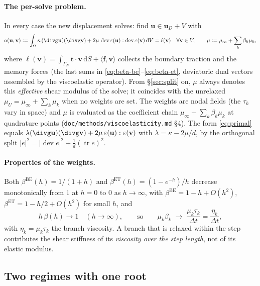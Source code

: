 \documentclass[11pt]{article}
\numberwithin{equation}{section}
\theoremstyle{remark}
\newcommand{\eps}{\varepsilon}
\newcommand{\dV}{\,\mathrm{d}V}
\newcommand{\dS}{\,\mathrm{d}S}
\newcommand{\tr}{\operatorname{tr}}
\newcommand{\dev}{\operatorname{dev}}
\newcommand{\vu}{\mathbf{u}}
\newcommand{\vv}{\mathbf{v}}
\newcommand{\vt}{\mathbf{t}}
\newcommand{\vf}{\mathbf{f}}
\newcommand{\code}[1]{\texttt{#1}}
\begin{document}
\paragraph{The per-solve problem.} In every case the new displacement
solves: find $\vu \in \vu_D + V$ with
\begin{equation}
  a(\vu,\vv) := \int_\Omega \kappa\,(\divg\vu)(\divg\vv)
   + 2\mu\,\dev\eps(\vu):\dev\eps(\vv)\dV = \ell(\vv)
  \quad \forall \vv\in V,
  \qquad
  \mu := \mu_\infty + \sum_k \beta_k \mu_k ,
  \label{eq:primal}
\end{equation}
where $\ell(\vv) = \int_{\Gamma_N}\vt\cdot\vv\dS + \langle \vf,\vv\rangle$
collects the boundary traction and the memory forces (the last sums in
\eqref{eq:beta-be}--\eqref{eq:beta-et}, deviatoric dual vectors
assembled by the viscoelastic operator). From \S\ref{sec:split} on, $\mu$
always denotes this \emph{effective} shear modulus of the solve; it
coincides with the unrelaxed $\mu_U = \mu_\infty + \sum_k\mu_k$ when no
weights are set. The weights are nodal fields (the $\tau_k$ vary in space)
and $\mu$ is evaluated as the coefficient chain $\mu_\infty + \sum_k
\beta_k\mu_k$ at quadrature points (\code{doc/methods/viscoelasticity.md} \S4).
The form \eqref{eq:primal} equals $\lambda(\divg\vu)(\divg\vv) +
2\mu\,\eps(\vu):\eps(\vv)$ with $\lambda = \kappa - 2\mu/d$, by the
orthogonal split $|e|^2 = |\dev e|^2 + \frac1d(\tr e)^2$.

\paragraph{Properties of the weights.} Both $\beta^{\mathrm{BE}}(h) =
1/(1+h)$ and $\beta^{\mathrm{ET}}(h) = (1-e^{-h})/h$ decrease
monotonically from $1$ at $h = 0$ to $0$ as $h\to\infty$, with
$\beta^{\mathrm{BE}} = 1 - h + O(h^2)$, $\beta^{\mathrm{ET}} = 1 - h/2 +
O(h^2)$ for small $h$, and
\begin{equation}
  h\,\beta(h) \to 1 \quad (h\to\infty),
  \qquad\text{so}\qquad
  \mu_k\beta_k \;\longrightarrow\; \frac{\mu_k\tau_k}{\Delta t}
  = \frac{\eta_k}{\Delta t},
  \label{eq:collapse}
\end{equation}
with $\eta_k = \mu_k\tau_k$ the branch viscosity. A branch that is relaxed
within the step contributes the shear stiffness of its \emph{viscosity
over the step length}, not of its elastic modulus.

\subsection{Two regimes with one root}
\label{sec:regimes}
\end{document}
